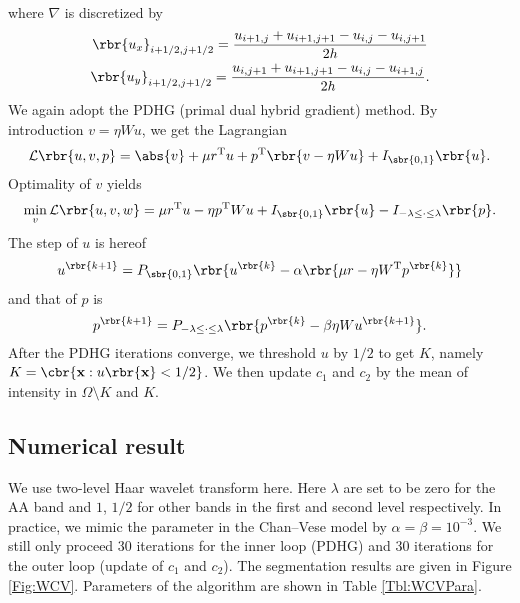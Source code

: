 \documentclass[english, nochinese]{pnote}
\begin{document}
where $\nabla$ is discretized by
\begin{gather}
\rbr{u_x}_{ i + 1 / 2, j + 1 / 2 } = \frac{ u_{ i + 1, j } + u_{ i + 1, j + 1 } - u_{ i, j } - u_{ i, j + 1 } }{ 2 h } \\
\rbr{u_y}_{ i + 1 / 2, j + 1 / 2 } = \frac{ u_{ i, j + 1 } + u_{ i + 1, j + 1 } - u_{ i, j } - u_{ i + 1, j } }{ 2 h }.
\end{gather}
We again adopt the PDHG (primal dual hybrid gradient) method. By introduction $ v = \eta W u $, we get the Lagrangian
\begin{equation}
\mathcal{L} \rbr{ u, v, p } = \abs{v} + \mu r^{\text{T}} u + p^{\text{T}} \rbr{ v - \eta W u } + I_{\sbr{ 0, 1 }} \rbr{u}.
\end{equation}
Optimality of $v$ yields
\begin{equation}
\min_v \mathcal{L} \rbr{ u, v, w } = \mu r^{\text{T}} u - \eta p^{\text{T}} W u + I_{\sbr{ 0, 1 }} \rbr{u} - I_{ -\lambda \le \cdot \le \lambda } \rbr{p}.
\end{equation}
The step of $u$ is hereof
\begin{equation}
u^{\rbr{ k + 1 }} = P_{\sbr{ 0, 1 }} \rbr{ u^{\rbr{k}} - \alpha \rbr{ \mu r - \eta W^{\text{T}} p^{\rbr{k}} } }
\end{equation}
and that of $p$ is
\begin{equation}
p^{\rbr{ k + 1 }} = P_{ -\lambda \le \cdot \le \lambda } \rbr{ p^{\rbr{k}} - \beta \eta W u^{\rbr{ k + 1 }} }.
\end{equation}
After the PDHG iterations converge, we threshold $u$ by $ 1 / 2 $ to get $K$, namely $ K = \cbr{ \mathbf{x} : u \rbr{\mathbf{x}} < 1 / 2 } $. We then update $c_1$ and $c_2$ by the mean of intensity in $ \Omega \setminus K $ and $K$.

\subsection{Numerical result}

We use two-level Haar wavelet transform here. Here $\lambda$ are set to be zero for the AA band and $1$, $ 1 / 2 $ for other bands in the first and second level respectively. In practice, we mimic the parameter in the Chan--Vese model by $ \alpha = \beta = 10^{-3} $. We still only proceed 30 iterations for the inner loop (PDHG) and 30 iterations for the outer loop (update of $c_1$ and $c_2$). The segmentation results are given in Figure \ref{Fig:WCV}. Parameters of the algorithm are shown in Table \ref{Tbl:WCVPara}.
\end{document}
